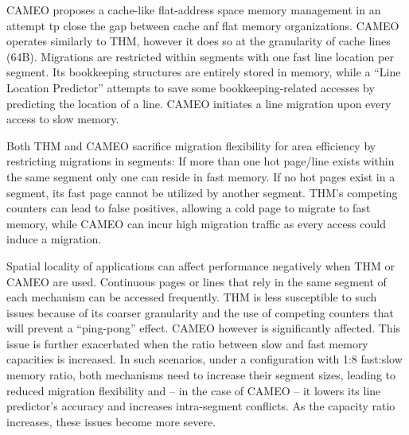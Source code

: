 CAMEO \cite{cameo} proposes a cache-like flat-address space memory management in an attempt tp close the gap between cache anf flat memory organizations. CAMEO operates similarly to THM, however it does so at the granularity of cache lines (64B). Migrations are restricted within segments with one fast line location per segment. Its bookkeeping structures are entirely stored in memory, while a ``Line Location Predictor'' attempts to save some bookkeeping-related accesses by predicting the location of a line. CAMEO initiates a line migration upon every access to slow memory.

Both THM and CAMEO sacrifice migration flexibility for area efficiency by restricting migrations in segments: If more than one hot page/line exists within the same segment only one can reside in fast memory. If no hot pages exist in a segment, its fast page cannot be utilized by another segment. THM's competing counters can lead to false positives, allowing a cold page to migrate to fast memory, while CAMEO can incur high migration traffic as every access could induce a migration. 

Spatial locality of applications can affect performance negatively when THM or CAMEO are used. Continuous pages or lines that rely in the same segment of each mechanism can be accessed frequently. THM is less susceptible to such issues because of its coarser granularity and the use of competing counters that will prevent a ``ping-pong'' effect. CAMEO however is significantly affected. This issue is further exacerbated when the ratio between slow and fast memory capacities is increased. In such scenarios, under a configuration with 1:8 fast:slow memory ratio, both mechanisms need to increase their segment sizes, leading to reduced migration flexibility and -- in the case of CAMEO -- it lowers its line predictor's accuracy and increases intra-segment conflicts. As the capacity ratio increases, these issues become more severe.
